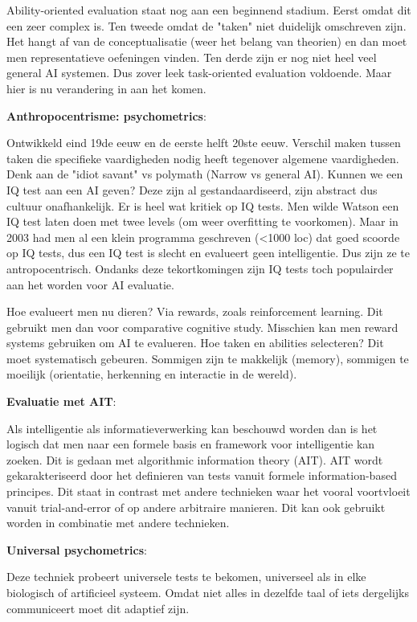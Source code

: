 \documentclass[11pt]{article}
\begin{document}
Ability-oriented evaluation staat nog aan een beginnend stadium. Eerst omdat dit een zeer complex is. Ten tweede omdat de "taken" niet duidelijk omschreven zijn. Het hangt af van de conceptualisatie (weer het belang van theorien) en dan moet men representatieve oefeningen vinden. Ten derde zijn er nog niet heel veel general AI systemen. Dus zover leek task-oriented evaluation voldoende. Maar hier is nu verandering in aan het komen.

\textbf{Anthropocentrisme: psychometrics}:

Ontwikkeld eind 19de eeuw en de eerste helft 20ste eeuw. Verschil maken tussen taken die specifieke vaardigheden nodig heeft tegenover algemene vaardigheden. Denk aan de "idiot savant" vs polymath (Narrow vs general AI). Kunnen we een IQ test aan een AI geven? Deze zijn al gestandaardiseerd, zijn abstract dus cultuur onafhankelijk. Er is heel wat kritiek op IQ tests. Men wilde Watson een IQ test laten doen met twee levels (om weer overfitting te voorkomen). Maar in 2003 had men al een klein programma geschreven (<1000 loc) dat goed scoorde op IQ tests, dus een IQ test is slecht en evalueert geen intelligentie. Dus zijn ze te antropocentrisch. Ondanks deze tekortkomingen zijn IQ tests toch populairder aan het worden voor AI evaluatie.

Hoe evalueert men nu dieren? Via rewards, zoals reinforcement learning. Dit gebruikt men dan voor comparative cognitive study. Misschien kan men reward systems gebruiken om AI te evalueren. Hoe taken en abilities selecteren? Dit moet systematisch gebeuren. Sommigen zijn te makkelijk (memory), sommigen te moeilijk (orientatie, herkenning en interactie in de wereld).

\textbf{Evaluatie met AIT}:

Als intelligentie als informatieverwerking kan beschouwd worden dan is het logisch dat men naar een formele basis en framework voor intelligentie kan zoeken. Dit is gedaan met algorithmic information theory (AIT). AIT wordt gekarakteriseerd door het definieren van tests vanuit formele information-based principes. Dit staat in contrast met andere technieken waar het vooral voortvloeit vanuit trial-and-error of op andere arbitraire manieren. Dit kan ook gebruikt worden in combinatie met andere technieken.

\textbf{Universal psychometrics}:

Deze techniek probeert universele tests te bekomen, universeel als in elke biologisch of artificieel systeem. Omdat niet alles in dezelfde taal of iets dergelijks communiceert moet dit adaptief zijn.
\end{document}
